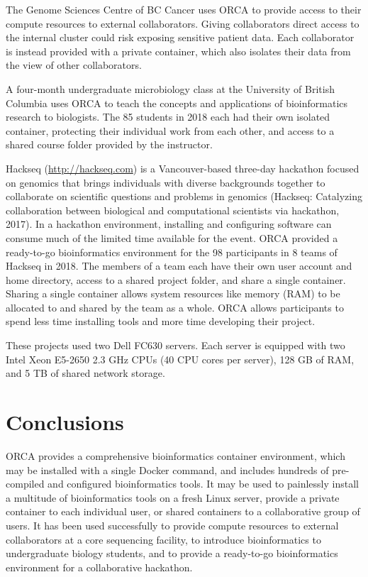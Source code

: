 \documentclass{bioinfo}
\begin{document}
The Genome Sciences Centre of BC Cancer uses ORCA to provide access to their compute resources to external collaborators. Giving collaborators direct access to the internal cluster could risk exposing sensitive patient data. Each collaborator is instead provided with a private container, which also isolates their data from the view of other collaborators.

A four-month undergraduate microbiology class at the University of British Columbia uses ORCA to teach the concepts and applications of bioinformatics research to biologists. The 85 students in 2018 each had their own isolated container, protecting their individual work from each other, and access to a shared course folder provided by the instructor.

Hackseq (\url{http://hackseq.com}) is a Vancouver-based three-day hackathon focused on genomics that brings individuals with diverse backgrounds together to collaborate on scientific questions and problems in genomics (Hackseq: Catalyzing collaboration between biological and computational scientists via hackathon, 2017). In a hackathon environment, installing and configuring software can consume much of the limited time available for the event. ORCA provided a ready-to-go bioinformatics environment for the 98 participants in 8 teams of Hackseq in 2018. The members of a team each have their own user account and home directory, access to a shared project folder, and share a single container. Sharing a single container allows system resources like memory (RAM) to be allocated to and shared by the team as a whole. ORCA allows participants to spend less time installing tools and more time developing their project.

These projects used two Dell FC630 servers. Each server is equipped with two Intel Xeon E5-2650 2.3 GHz CPUs (40 CPU cores per server), 128 GB of RAM, and 5 TB of shared network storage.

\section{Conclusions}

ORCA provides a comprehensive bioinformatics container environment, which may be installed with a single Docker command, and includes hundreds of pre-compiled and configured bioinformatics tools. It may be used to painlessly install a multitude of bioinformatics tools on a fresh Linux server, provide a private container to each individual user, or shared containers to a collaborative group of users. It has been used successfully to provide compute resources to external collaborators at a core sequencing facility, to introduce bioinformatics to undergraduate biology students, and to provide a ready-to-go bioinformatics environment for a collaborative hackathon.
\end{document}
